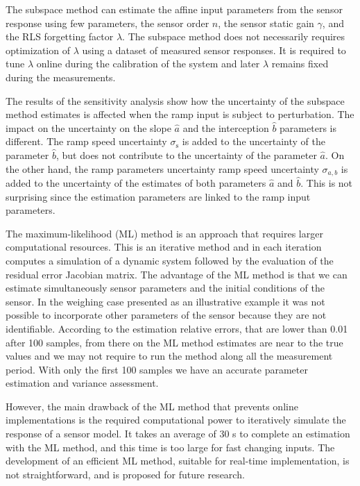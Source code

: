 The subspace method can estimate the affine input parameters from the sensor response using few parameters, the sensor order $n$, the sensor static gain $\gamma$, and the RLS forgetting factor $\lambda$.
The subspace method does not necessarily requires optimization of $\lambda$ using a dataset of measured sensor responses.
It is required to tune $\lambda$ online during the calibration of the system and later $\lambda$ remains fixed during the measurements.

The results of the sensitivity analysis show how the uncertainty of the subspace method estimates is affected when the ramp input is subject to perturbation.
The impact on the uncertainty on the slope $\widehat{a}$ and the interception $\widehat{b}$ parameters is different.
The ramp speed uncertainty $\sigma_{\mathrm{s}}$ is added to the uncertainty of the parameter $\widehat{b}$, but does not contribute to the uncertainty of the parameter $\widehat{a}$.
On the other hand, the ramp parameters uncertainty ramp speed uncertainty $\sigma_{a,b}$ is added to the uncertainty of the estimates of both parameters $\widehat{a}$ and $\widehat{b}$.
This is not surprising since the estimation parameters are linked to the ramp input parameters.

The maximum-likelihood (ML) method is an approach that requires larger computational resources.
This is an iterative method and in each iteration computes a simulation of a dynamic system followed by the evaluation of the residual error Jacobian matrix.
The advantage of the ML method is that we can estimate simultaneously sensor parameters and the initial conditions of the sensor.
In the weighing case presented as an illustrative example it was not possible to incorporate other parameters of the sensor because they are not identifiable.
According to the estimation relative errors, that are lower than 0.01 after 100 samples, from there on the ML method estimates are near to the true values and we may not require to run the method along all the measurement period.
With only the first 100 samples we have an accurate parameter estimation and variance assessment.

However, the main drawback of the ML method that prevents online implementations is the required computational power to iteratively simulate the response of a sensor model.
It takes an average of 30 s to complete an estimation with the ML method, and this time is too large for fast changing inputs.
The development of an efficient ML method, suitable for real-time implementation, is not straightforward, and is proposed for future research.

